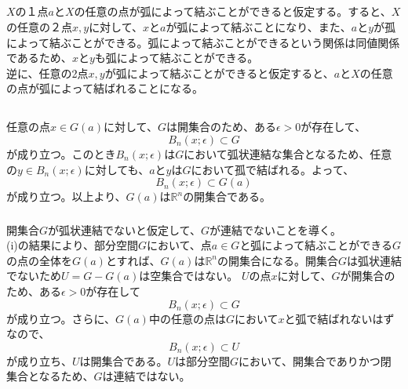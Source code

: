 \documentclass{jsarticle}
\begin{document}
\subsection{}

$X$の１点$a$と$X$の任意の点が弧によって結ぶことができると仮定する。すると、$X$の任意の２点$x,y$に対して、$x$と$a$が弧によって結ぶことになり、また、$a$と$y$が孤によって結ぶことができる。弧によって結ぶことができるという関係は同値関係であるため、$x$と$y$も弧によって結ぶことができる。\\
逆に、任意の2点$x,y$が弧によって結ぶことができると仮定すると、$a$と$X$の任意の点が弧によって結ばれることになる。


\subsection{}
\subsubsection{}
任意の点$x\in G(a)$に対して、$G$は開集合のため、ある$\epsilon>0$が存在して、
\[B_n(x;\epsilon)\subset G\]
が成り立つ。このとき$B_n(x;\epsilon)$は$G$において弧状連結な集合となるため、任意の$y\in B_n(x;\epsilon)$に対しても、$a$と$y$は$G$において孤で結ばれる。よって、
\[B_n(x;\epsilon)\subset G(a)\]
が成り立つ。以上より、$G(a)$は$\mathbb{R}^n$の開集合である。
\subsubsection{}
開集合$G$が弧状連結でないと仮定して、$G$が連結でないことを導く。\\
(i)の結果により、部分空間$G$において、点$a\in G$と弧によって結ぶことができる$G$の点の全体を$G(a)$とすれば、$G(a)$は$\mathbb{R}^n$の開集合になる。開集合$G$は弧状連結でないため$U=G-G(a) $は空集合ではない。
$U$の点$x$に対して、$G$が開集合のため、ある$\epsilon>0$が存在して
\[B_n(x;\epsilon)\subset G\]
が成り立つ。さらに、$G(a)$中の任意の点は$G$において$x$と弧で結ばれないはずなので、
\[B_n(x;\epsilon)\subset U\]
が成り立ち、$U$は開集合である。$U$は部分空間$G$において、開集合でありかつ閉集合となるため、$G$は連結ではない。















\end{document}
